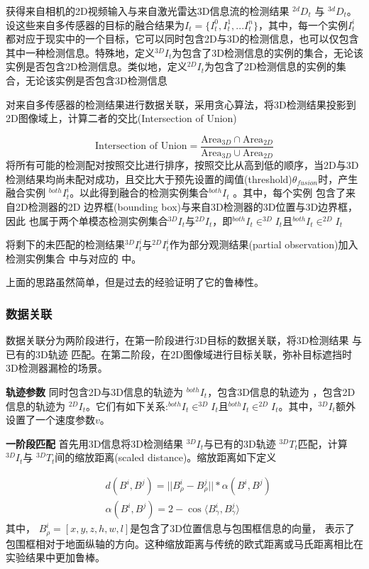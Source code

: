 获得来自相机的2D视频输入与来自激光雷达3D信息流的检测结果 $^{2d}D_t$ 与 $^{3d}D_t$。设这些来自多传感器的目标的融合结果为$I_t=\{I_t^0,I_t^1,...I_t^n\}$，其中，每一个实例$I_t^i$都对应于现实中的一个目标，它可以同时包含2D与3D的检测信息，也可以仅包含其中一种检测信息。特殊地，定义$^{3D}I_t$为包含了3D检测信息的实例的集合，无论该实例是否包含2D检测信息。类似地，定义$^{2D}I_t$为包含了2D检测信息的实例的集合，无论该实例是否包含3D检测信息

对来自多传感器的检测结果进行数据关联，采用贪心算法，将3D检测结果投影到2D图像域上，计算二者的交比(Intersection of Union)

\begin{equation}
    \text{Intersection of Union} = \frac{\text{Area}_{3D}\cap\text{Area}_{2D}}{\text{Area}_{3D}\cup\text{Area}_{2D}}
\end{equation}
将所有可能的检测配对按照交比进行排序，按照交比从高到低的顺序，当2D与3D检测结果均尚未配对成功，且交比大于预先设置的阈值(threshold)$\theta_{fusion}$时，产生融合实例 $^{both}I_t^i$。以此得到融合的检测实例集合$^{both}I_t$ 。其中，每个实例 包含了来自2D检测器的2D 边界框(bounding box)与来自3D检测器的3D位置与3D边界框，因此 也属于两个单模态检测实例集合$^{3D}I_t$与$^{2D}I_t$，即$^{both}I_t\in^{3D}I_t$且$^{both}I_t\in^{2D}I_t$

将剩下的未匹配的检测结果$^{3D}I_t^i$与$^{2D}I_t^i$作为部分观测结果(partial observation)加入检测实例集合 中与对应的 中。

上面的思路虽然简单，但是过去的经验证明了它的鲁棒性。

\subsubsection{数据关联}

数据关联分为两阶段进行，在第一阶段进行3D目标的数据关联，将3D检测结果 与已有的3D轨迹 匹配。在第二阶段，在2D图像域进行目标关联，弥补目标遮挡时3D检测器漏检的场景。

\textbf{轨迹参数} 同时包含2D与3D信息的轨迹为 $^{both}I_t$，包含3D信息的轨迹为 ，包含2D信息的轨迹为 $^{2D}I_t$。它们有如下关系:$^{both}I_t\in^{3D}I_t$且$^{both}I_t\in^{2D}I_t$。其中，$^{3D}I_t$额外设置了一个速度参数$v$。

\textbf{一阶段匹配} 首先用3D信息将3D检测结果 $^{3D}I_t$与已有的3D轨迹 $^{3D}T_t$匹配，计算 $^{3D}I_t$与 $^{3D}T_t$间的缩放距离(scaled distance)。缩放距离如下定义

\begin{eqnarray}
    &d(B^i,B^j)=||B^i_\rho-B^j_\rho||*\alpha(B^i,B^j)\\
    &\alpha(B^i,B^j)=2-\cos\langle B_\gamma^i,B_\gamma^j\rangle
\end{eqnarray}
其中， $B_\rho^i=[x,y,z,h,w,l]$是包含了3D位置信息与包围框信息的向量， 表示了包围框相对于地面纵轴的方向。这种缩放距离与传统的欧式距离或马氏距离相比在实验结果中更加鲁棒。

